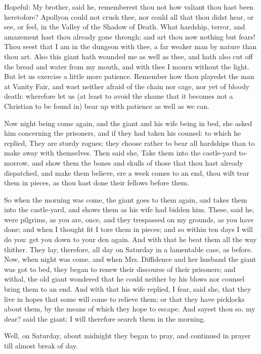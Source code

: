 Hopeful: My brother, said he, rememberest thou not how valiant thou hast been heretofore? Apollyon could not crush thee, nor could all that thou didst hear, or see, or feel, in the Valley of the Shadow of Death. What hardship, terror, and amazement hast thou already gone through; and art thou now nothing but fears! Thou seest that I am in the dungeon with thee, a far weaker man by nature than thou art. Also this giant hath wounded me as well as thee, and hath also cut off the bread and water from my mouth, and with thee I mourn without the light. But let us exercise a little more patience. Remember how thou playedst the man at Vanity Fair, and wast neither afraid of the chain nor cage, nor yet of bloody death: wherefore let us (at least to avoid the shame that it becomes not a Christian to be found in) bear up with patience as well as we can.

Now night being come again, and the giant and his wife being in bed, she asked him concerning the prisoners, and if they had taken his counsel: to which he replied, They are sturdy rogues; they choose rather to bear all hardships than to make away with themselves. Then said she, Take them into the castle-yard to-morrow, and show them the bones and skulls of those that thou hast already dispatched, and make them believe, ere a week comes to an end, thou wilt tear them in pieces, as thou hast done their fellows before them.

So when the morning was come, the giant goes to them again, and takes them into the castle-yard, and shows them as his wife had bidden him. These, said he, were pilgrims, as you are, once, and they trespassed on my grounds, as you have done; and when I thought fit I tore them in pieces; and so within ten days I will do you: get you down to your den again. And with that he beat them all the way thither. They lay, therefore, all day on Saturday in a lamentable case, as before. Now, when night was come, and when Mrs. Diffidence and her husband the giant was got to bed, they began to renew their discourse of their prisoners; and withal, the old giant wondered that he could neither by his blows nor counsel bring them to an end. And with that his wife replied, I fear, said she, that they live in hopes that some will come to relieve them; or that they have picklocks about them, by the means of which they hope to escape. And sayest thou so, my dear? said the giant; I will therefore search them in the morning.

Well, on Saturday, about midnight they began to pray, and continued in prayer till almost break of day.

